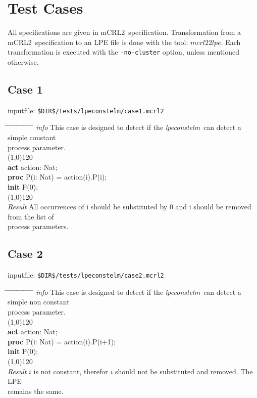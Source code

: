 \index{}\documentclass[a4paper,10pt]{article}
\theoremstyle{plain}
\theoremstyle{definition}
\newcommand{\tool}{\textit{lpeconstelm}}
\newcommand{\mcrl}{mCRL2}
\newcommand{\pp}{process parameter}
\newcommand{\pps}{process parameters}
\newcommand{\ti}{\textit}
\newcommand{\tb}{\textbf}
\newcommand{\tabw}{\hspace*{15.mm} \= \hspace*{20.mm} \= \hspace*{5.mm} \= \hspace*{5.mm} \= \hspace*{5.mm} \= \hspace*{5.mm}  \= \hspace*{5.mm}  \= \hspace*{5.mm}  \= \hspace*{5.mm} \= \hspace*{5.mm} \= \hspace*{5.mm}  \= \hspace*{5.mm}  \= \hspace*{5.mm}\kill}
\begin{document}
\section{Test Cases}
All specifications are given in \mcrl\ specification.
Transformation from a \mcrl\ specification to an LPE file is done with the tool:
$mcrl22lpe$. Each transformation is executed with the \verb"-no-cluster" option, unless
mentioned otherwise.

\subsection*{Case 1}
inputfile: \verb"$DIR$/tests/lpeconstelm/case1.mcrl2"
\begin{tabbing}
\tabw
\ti{info} \> This case is designed to detect if the \tool\ can detect a simple constant \\
\> \pp .\\
\line(1,0){120}\\

\tb{act}  \> action: Nat;\\
\tb{proc} \> P(i: Nat) \> = \> action(i).P(i);\\
\tb{init} \> P(0);\\

\line(1,0){120}\\
\ti{Result} 
\> All occurrences of i should be substituted by 0 and i should be removed from the list of \\
\> \pps . \\ 
\end{tabbing}

\subsection*{Case 2}
inputfile: \verb"$DIR$/tests/lpeconstelm/case2.mcrl2"
\begin{tabbing}
\tabw
\ti{info} 
\> This case is designed to detect if the \tool\ can detect a simple non constant \\
\> \pp .\\
\line(1,0){120}\\
\tb{act}  \> action: Nat;\\
\tb{proc} \> P(i: Nat) \> = \> action(i).P(i+1);\\
\tb{init} \> P(0);\\
\line(1,0){120}\\
\ti{Result} \> $i$ is not constant, therefor $i$ should not be substituted and removed. The LPE \\
\> remains the same. \\ 
\end{tabbing}
\end{document}
